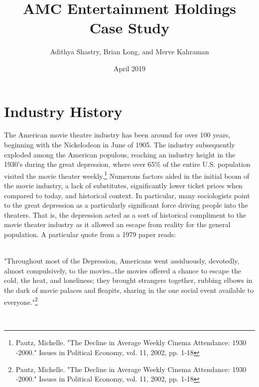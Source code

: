 \documentclass[12pt]{article}
\title{AMC Entertainment Holdings Case Study}
\author{Adithya Shastry, Brian Long, and Merve Kahraman}
\date{April 2019}
\begin{document}
\maketitle
\newpage
\tableofcontents
\newpage
\doublespacing
\section{Industry History}


The American movie theatre industry has been around for over 100 years, beginning with the Nickelodeon  in June of 1905. The industry subsequently exploded among the American populous, reaching an industry height in the 1930’s during the great depression, where over 65\% of the entire U.S. population visited the movie theater weekly.\footnote{Pautz, Michelle. "The Decline in Average Weekly Cinema Attendance: 1930 -2000." Issues in Political
    Economy, vol. 11, 2002, pp. 1-18
} Numerous factors aided in the initial boom of the movie industry, a lack of substitutes, significantly lower ticket prices when compared to today, and historical context. In particular, many sociologists point to the great depression as a particularly significant force driving people into the theaters. That is, the depression acted as a sort of historical compliment to the movie theater industry as it allowed an escape from reality for the general population. A particular quote from a 1979 paper reads:

\\

"Throughout most of the Depression, Americans went assiduously, devotedly, almost compulsively, to the movies…the movies offered a chance to escape the cold, the heat, and loneliness; they brought strangers together, rubbing elbows in the dark of movie palaces and fleapits, sharing in the one social event available to everyone."\footnote{Pautz, Michelle. "The Decline in Average Weekly Cinema Attendance: 1930 -2000." Issues in Political
    Economy, vol. 11, 2002, pp. 1-18
}

\\
\end{document}
